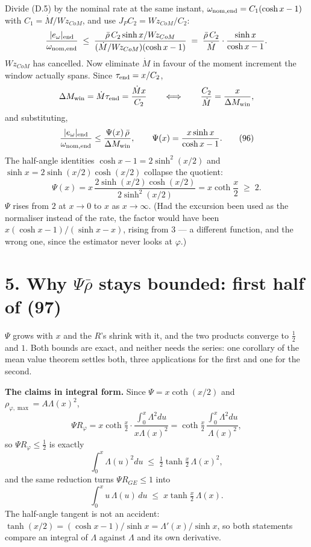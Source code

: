 \documentclass[11pt]{article}
\newcommand{\Wz}{W\!z_{CoM}}
\newcommand{\te}{\tau_{\rm end}}
\newcommand{\rbar}{\bar\rho}
\begin{document}
Divide (D.5) by the nominal rate at the same instant,
$\omega_{\rm nom,end} = C_1(\cosh x - 1)$ with $C_1 = \dot M/\Wz$, and
use $J_PC_2 = \Wz/C_2$:
\[
  \frac{|e_\omega|_{\rm end}}{\omega_{\rm nom,end}}
  \;\le\; \frac{\rbar\,C_2\sinh x/\Wz}
               {(\dot M/\Wz)(\cosh x - 1)}
  \;=\; \frac{\rbar\,C_2}{\dot M}\cdot\frac{\sinh x}{\cosh x - 1}.
\]
$\Wz$ has cancelled. Now eliminate $\dot M$ in favour of the moment
increment the window actually spans. Since $\te = x/C_2$,
\[
  \Delta M_{\rm win} = \dot M\te = \frac{\dot M x}{C_2}
  \qquad\Longleftrightarrow\qquad
  \frac{C_2}{\dot M} = \frac{x}{\Delta M_{\rm win}},
\]
and substituting,
\begin{equation}
  \frac{|e_\omega|_{\rm end}}{\omega_{\rm nom,end}}
  \le \frac{\Psi(x)\,\rbar}{\Delta M_{\rm win}},
  \qquad
  \Psi(x) = \frac{x\sinh x}{\cosh x - 1} .
  \tag{96}
\end{equation}
The half-angle identities $\cosh x - 1 = 2\sinh^2(x/2)$ and
$\sinh x = 2\sinh(x/2)\cosh(x/2)$ collapse the quotient:
\[
  \Psi(x) = x\,\frac{2\sinh(x/2)\cosh(x/2)}{2\sinh^2(x/2)}
          = x\coth\frac{x}{2} \;\ge\; 2 .
\]
$\Psi$ rises from $2$ at $x\to0$ to $x$ as $x\to\infty$. (Had the
excursion been used as the normaliser instead of the rate, the factor
would have been $x(\cosh x - 1)/(\sinh x - x)$, rising from $3$ ---
a different function, and the wrong one, since the estimator never
looks at $\varphi$.)

\section*{5. Why $\Psi\rbar$ stays bounded: first half of (97)}

$\Psi$ grows with $x$ and the $R$'s shrink with it, and the two
products converge to $\tfrac12$ and $1$. Both bounds are exact, and
neither needs the series: one corollary of the mean value theorem
settles both, three applications for the first and one for the
second.

\textbf{The claims in integral form.} Since
$\Psi = x\coth(x/2)$ and $\rho_{\varphi,\max} = A\Lambda(x)^2$,
\[
  \Psi R_\varphi
  = x\coth\tfrac{x}{2}\cdot\frac{\int_0^x\Lambda^2du}{x\Lambda(x)^2}
  = \coth\tfrac{x}{2}\,\frac{\int_0^x\Lambda^2du}{\Lambda(x)^2},
\]
so $\Psi R_\varphi\le\tfrac12$ is exactly
\begin{equation}
  \int_0^x\!\Lambda(u)^2du \;\le\; \tfrac12\tanh\tfrac{x}{2}\,\Lambda(x)^2,
  \tag{D.8}
\end{equation}
and the same reduction turns $\Psi R_{GE}\le1$ into
\begin{equation}
  \int_0^x\! u\,\Lambda(u)\,du \;\le\; x\tanh\tfrac{x}{2}\,\Lambda(x) .
  \tag{D.9}
\end{equation}
The half-angle tangent is not an accident: $\tanh(x/2) =
(\cosh x - 1)/\sinh x = \Lambda'(x)/\sinh x$, so both statements
compare an integral of $\Lambda$ against $\Lambda$ and its own
derivative.
\end{document}
